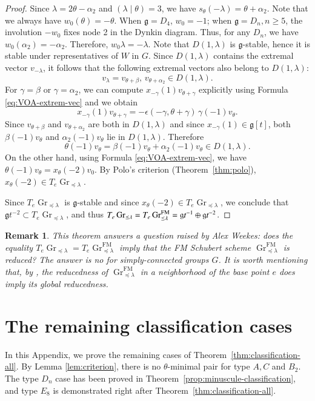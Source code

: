 \documentclass[a4paper, 12pt]{amsart}
\newtheorem{remark}[theorem]{Remark}
\theoremstyle{definition}
\newcommand{\g}{\mathfrak g}
\DeclareMathOperator{\Gr}{\mathrm{Gr}}
\begin{document}
\begin{proof}
Since $\lambda=2\theta-\alpha_2$ and
$(\lambda\mid\theta)=3$, we have  $s_\theta(-\lambda)=\theta+\alpha_2$.  Note that we always have $w_0(\theta)=-\theta$.  When $\g=D_4$,  $w_0=-1$; when $\g=D_n, n\geq 5$,  the involution $-w_0$ fixes node 2 in the Dynkin diagram. Thus, for any $D_n$, we have $w_0(\alpha_2)=-\alpha_2$.  Therefore,  $w_0\lambda=-\lambda$.  Note that $D(1,\lambda)$  is $\mathfrak{g}$-stable, hence it is stable under representatives of $W$ in $G$. Since $D(1,\lambda)$ contains the extremal vector $v_{-\lambda}$, it follows that the following extremal vectors also belong to $D(1, \lambda)$:
\begin{equation}\label{eq:v_D}
v_{\lambda}=v_{\theta+\beta},\,
v_{\theta+\alpha_2}\in D(1,\lambda).
\end{equation}
For $\gamma= \beta$ or $\gamma= \alpha_2$, we can compute $x_{-\gamma}(1)v_{\theta+\gamma}$ explicitly using Formula \eqref{eq:VOA-extrem-vec} and we obtain
\[
x_{-\gamma}(1)v_{\theta+\gamma}
=-\epsilon(-\gamma,\theta+\gamma)\,\gamma(-1)v_\theta.
\]
Since $v_{\theta+\beta}$ and $v_{\theta+\alpha_2}$ are both in $D(1, \lambda)$ and since $x_{-\gamma}(1)\in\g[t]$, both
$\beta(-1)v_\theta$ and $\alpha_2(-1)v_\theta$ lie in $D(1,\lambda)$. Therefore
\[
\theta(-1)v_\theta
=\beta(-1)v_\theta+\alpha_2(-1)v_\theta\in D(1,\lambda).
\]
On the other hand, using Formula \eqref{eq:VOA-extrem-vec}, we have  $\theta(-1)v_{\theta}=x_{\theta}(-2)v_0$.
By Polo's criterion (Theorem~\ref{thm:polo}), $x_\theta(-2)\in T_e\Gr_{\preceq\lambda}$.

Since $T_{e}\Gr_{\preceq \lambda}$ is $\g$-stable and since $x_{\theta}(-2) \in T_e \Gr_{\preceq \lambda}$, we conclude that
$\g t^{-2}\subset T_e \Gr_{\preceq \lambda}$, and
thus $T_e \Gr_{\preceq \lambda}= T_e\Gr^{\rm FM}_{\preceq \lambda}= \g t^{-1}\oplus \g t^{-2}$.
\end{proof}
\begin{remark}
This theorem answers a question raised by Alex Weekes: does the equality
$T_e\Gr_{\preceq\lambda}= T_e\Gr^{\mathrm{FM}}_{\preceq\lambda}$
imply that the FM Schubert scheme
$\Gr^{\mathrm{FM}}_{\preceq\lambda}$ is reduced?
The answer is no for simply-connected groups $G$. It is worth mentioning that, by \cite[Proposition~5.1]{KMW}, the reducedness of
$\Gr^{\mathrm{FM}}_{\preceq\lambda}$ in a neighborhood of the base point $e$ does imply its global reducedness.
\end{remark}


\appendix
{}
\section{The remaining classification cases}\label{app:classification}
In this Appendix, we prove the remaining  cases of Theorem~\ref{thm:classification-all}. By Lemma \ref{lem:criterion}, there is no $\theta$-minimal pair for type $A,C$ and $B_2$. The type $D_n$ case has been proved in Theorem~\ref{prop:minuscule-classification}, and type $E_8$ is demonstrated right after Theorem~\ref{thm:classification-all}. 
\end{document}
